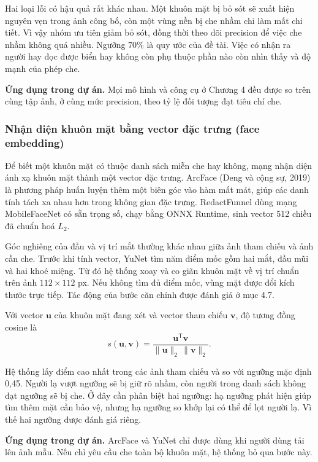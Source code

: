 Hai loại lỗi có hậu quả rất khác nhau. Một khuôn mặt bị bỏ sót sẽ xuất hiện nguyên vẹn trong ảnh công bố, còn một vùng nền bị che nhầm chỉ làm mất chi tiết. Vì vậy nhóm ưu tiên giảm bỏ sót, đồng thời theo dõi precision để việc che nhầm không quá nhiều. Ngưỡng 70\% là quy ước của đề tài. Việc có nhận ra người hay đọc được biển hay không còn phụ thuộc phần nào còn nhìn thấy và độ mạnh của phép che.

\textbf{Ứng dụng trong dự án.} Mọi mô hình và công cụ ở Chương 4 đều được so trên cùng tập ảnh, ở cùng mức precision, theo tỷ lệ đối tượng đạt tiêu chí che.

\subsubsection{Nhận diện khuôn mặt bằng vector đặc trưng (face embedding)}

Để biết một khuôn mặt có thuộc danh sách miễn che hay không, mạng nhận diện ánh xạ khuôn mặt thành một vector đặc trưng. ArcFace (Deng và cộng sự, 2019) là phương pháp huấn luyện thêm một biên góc vào hàm mất mát, giúp các danh tính tách xa nhau hơn trong không gian đặc trưng. RedactFunnel dùng mạng MobileFaceNet có sẵn trọng số, chạy bằng ONNX Runtime, sinh vector 512 chiều đã chuẩn hoá $L_2$.

Góc nghiêng của đầu và vị trí mắt thường khác nhau giữa ảnh tham chiếu và ảnh cần che. Trước khi tính vector, YuNet tìm năm điểm mốc gồm hai mắt, đầu mũi và hai khoé miệng. Từ đó hệ thống xoay và co giãn khuôn mặt về vị trí chuẩn trên ảnh $112\times112$ px. Nếu không tìm đủ điểm mốc, vùng mặt được đổi kích thước trực tiếp. Tác động của bước căn chỉnh được đánh giá ở mục 4.7.

Với vector $\mathbf{u}$ của khuôn mặt đang xét và vector tham chiếu $\mathbf{v}$, độ tương đồng cosine là
\[
s(\mathbf{u},\mathbf{v})=\frac{\mathbf{u}^{\mathsf T}\mathbf{v}}{\|\mathbf{u}\|_2\,\|\mathbf{v}\|_2}.
\]

Hệ thống lấy điểm cao nhất trong các ảnh tham chiếu và so với ngưỡng mặc định 0,45. Người lạ vượt ngưỡng sẽ bị giữ rõ nhầm, còn người trong danh sách không đạt ngưỡng sẽ bị che. Ở đây cần phân biệt hai ngưỡng: hạ ngưỡng phát hiện giúp tìm thêm mặt cần bảo vệ, nhưng hạ ngưỡng so khớp lại có thể để lọt người lạ. Vì thế hai ngưỡng được đánh giá riêng.

\textbf{Ứng dụng trong dự án.} ArcFace và YuNet chỉ được dùng khi người dùng tải lên ảnh mẫu. Nếu chỉ yêu cầu che toàn bộ khuôn mặt, hệ thống bỏ qua bước này.

